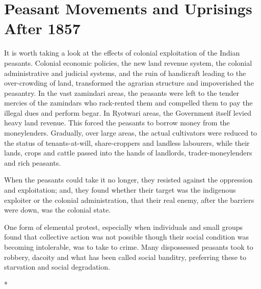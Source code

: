 
\chapter{Peasant Movements and Uprisings After 1857}

It is worth taking a look at the effects of colonial exploitation of the Indian peasants. Colonial economic policies, the new land revenue system, the colonial administrative and judicial systems, and the ruin of handicraft leading to the over-crowding of land, transformed the agrarian structure and impoverished the peasantry. In the vast zamindari areas, the peasants were left to the tender mercies of the zamindars who rack-rented them and compelled them to pay the illegal dues and perform begar. In Ryotwari areas, the Government itself levied heavy land revenue. This forced the peasants to borrow money from the moneylenders. Gradually, over large areas, the actual cultivators were reduced to the status of tenants-at-will, share-croppers and landless labourers, while their lands, crops and cattle passed into the hands of landlords, trader-moneylenders and rich peasants.

When the peasants could take it no longer, they resisted against the oppression and exploitation; and, they found whether their target was the indigenous exploiter or the colonial administration, that their real enemy, after the barriers were down, was the colonial state.

One form of elemental protest, especially when individuals and small groups found that collective action was not possible though their social condition was becoming intolerable, was to take to crime. Many dispossessed peasants took to robbery, dacoity and what has been called social banditry, preferring these to starvation and social degradation.

\begin{center}*\end{center}

